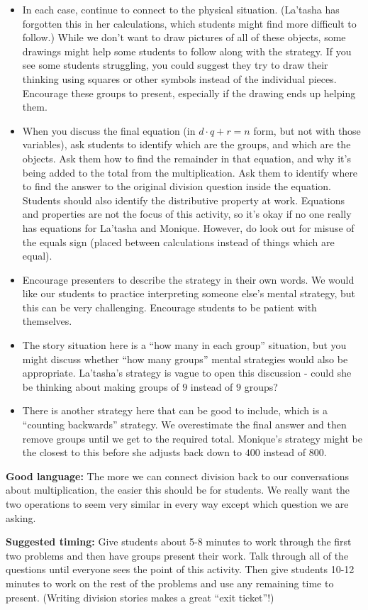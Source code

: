 \documentclass[nooutcomes,noauthor]{ximera}
\begin{document}
\begin{instructorNotes}
\begin{itemize}
	\item In each case, continue to connect to the physical situation. (La'tasha has forgotten this in her calculations, which students might find more difficult to follow.) While we don't want to draw pictures of all of these objects, some drawings might help some students to follow along with the strategy. If you see some students struggling, you could suggest they try to draw their thinking using squares or other symbols instead of the individual pieces. Encourage these groups to present, especially if the drawing ends up helping them.
	\item When you discuss the final equation (in $d \cdot q + r = n$ form, but not with those variables), ask students to identify which are the groups, and which are the objects. Ask them how to find the remainder in that equation, and why it's being added to the total from the multiplication. Ask them to identify where to find the answer to the original division question inside the equation. Students should also identify the distributive property at work. Equations and properties are not the focus of this activity, so it's okay if no one really has equations for La'tasha and Monique. However, do look out for misuse of the equals sign (placed between calculations instead of things which are equal).
	\item Encourage presenters to describe the strategy in their own words. We would like our students to practice interpreting someone else's mental strategy, but this can be very challenging. Encourage students to be patient with themselves.
	\item The story situation here is a ``how many in each group'' situation, but you might discuss whether ``how many groups'' mental strategies would also be appropriate. La'tasha's strategy is vague to open this discussion - could she be thinking about making groups of $9$ instead of $9$ groups?
	\item There is another strategy here that can be good to include, which is a ``counting backwards'' strategy. We overestimate the final answer and then remove groups until we get to the required total. Monique's strategy might be the closest to this before she adjusts back down to $400$ instead of $800$.
\end{itemize}


{\bf Good language:}  The more we can connect division back to our conversations about multiplication, the easier this should be for students. We really want the two operations to seem very similar in every way except which question we are asking. 


{\bf Suggested timing:} Give students about 5-8 minutes to work through the first two problems and then have groups present their work. Talk through all of the questions until everyone sees the point of this activity. Then give students 10-12 minutes to work on the rest of the problems and use any remaining time to present. (Writing division stories makes a great ``exit ticket''!)




\end{instructorNotes}
\end{document}
